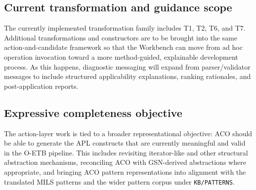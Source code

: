 \documentclass[12pt,twoside,a4paper]{article}
\begin{document}
\subsection{Current transformation and guidance scope}

The currently implemented transformation family includes T1, T2, T6, and T7.
Additional transformations and constructors are to be brought into the same action-and-candidate framework so that the Workbench can move from ad hoc operation invocation toward a more method-guided, explainable development process.
As this happens, diagnostic messaging will expand from parser/validator messages to include structured applicability explanations, ranking rationales, and post-application reports.

\subsection{Expressive completeness objective}

The action-layer work is tied to a broader representational objective: ACO should be able to generate the APL constructs that are currently meaningful and valid in the O-ETB pipeline.
This includes revisiting iterator-like and other structural abstraction mechanisms, reconciling ACO with GSN-derived abstractions where appropriate, and bringing ACO pattern representations into alignment with the translated MILS patterns and the wider pattern corpus under \texttt{KB/PATTERNS}.
\end{document}
